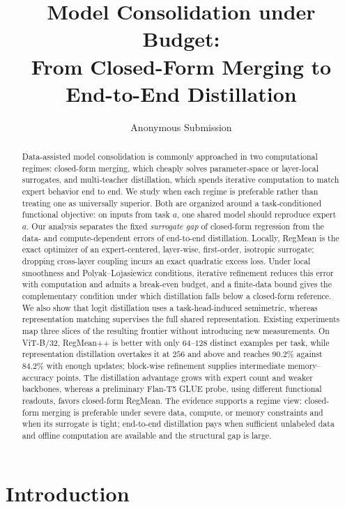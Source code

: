 \documentclass[letterpaper]{article} %
\title{Model Consolidation under Budget:\\
From Closed-Form Merging to End-to-End Distillation}
\author{Anonymous Submission}
\theoremstyle{plain}
\theoremstyle{definition}
\begin{document}
\maketitle

\begin{abstract}
Data-assisted model consolidation is commonly approached in two computational regimes: closed-form merging, which cheaply solves parameter-space or layer-local surrogates, and multi-teacher distillation, which spends iterative computation to match expert behavior end to end.
We study when each regime is preferable rather than treating one as universally superior.
Both are organized around a task-conditioned functional objective: on inputs from task $a$, one shared model should reproduce expert $a$.
Our analysis separates the fixed \emph{surrogate gap} of closed-form regression from the data- and compute-dependent errors of end-to-end distillation.
Locally, RegMean is the exact optimizer of an expert-centered, layer-wise, first-order, isotropic surrogate; dropping cross-layer coupling incurs an exact quadratic excess loss.
Under local smoothness and Polyak--Lojasiewicz conditions, iterative refinement reduces this error with computation and admits a break-even budget, and a finite-data bound gives the complementary condition under which distillation falls below a closed-form reference.
We also show that logit distillation uses a task-head-induced semimetric, whereas representation matching supervises the full shared representation.
Existing experiments map three slices of the resulting frontier without introducing new measurements.
On ViT-B/32, RegMean++ is better with only $64$--$128$ distinct examples per task, while representation distillation overtakes it at $256$ and above and reaches $90.2\%$ against $84.2\%$ with enough updates; block-wise refinement supplies intermediate memory--accuracy points.
The distillation advantage grows with expert count and weaker backbones, whereas a preliminary Flan-T5 GLUE probe, using different functional readouts, favors closed-form RegMean.
The evidence supports a regime view: closed-form merging is preferable under severe data, compute, or memory constraints and when its surrogate is tight; end-to-end distillation pays when sufficient unlabeled data and offline computation are available and the structural gap is large.
\end{abstract}

\section{Introduction}
\label{sec:intro}
\end{document}
